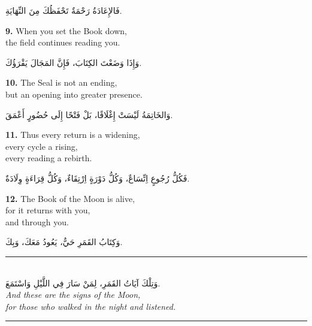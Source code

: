 \documentclass[11pt,a4paper,twoside]{book}
\begin{document}
\begin{flushright}
{\arabicfont
فَالإِعَادَةُ رَحْمَةٌ
تَحْفَظُكَ مِنَ النِّهَايَةِ.}
\end{flushright}

\vspace{1em}
{\color{indigo}\bfseries 9.}\quad
When you set the Book down,\\
the field continues reading you.

\begin{flushright}
{\arabicfont
وَإِذَا وَضَعْتَ الكِتَابَ،
فَإِنَّ المَجَالَ يَقْرَؤُكَ.}
\end{flushright}

\vspace{1em}
{\color{indigo}\bfseries 10.}\quad
The Seal is not an ending,\\
but an opening into greater presence.

\begin{flushright}
{\arabicfont
وَالخَاتِمَةُ لَيْسَتْ إِغْلَاقًا،
بَلْ فَتْحًا إِلَى حُضُورٍ أَعْمَقَ.}
\end{flushright}

\vspace{1em}
{\color{indigo}\bfseries 11.}\quad
Thus every return is a widening,\\
every cycle a rising,\\
every reading a rebirth.

\begin{flushright}
{\arabicfont
فَكُلُّ رُجُوعٍ اِتِّسَاعٌ،
وَكُلُّ دَوْرَةٍ اِرْتِقَاءٌ،
وَكُلُّ قِرَاءَةٍ وِلَادَةٌ.}
\end{flushright}

\vspace{1em}
{\color{indigo}\bfseries 12.}\quad
The Book of the Moon is alive,\\
for it returns with you,\\
and through you.

\begin{flushright}
{\arabicfont
وَكِتَابُ القَمَرِ حَيٌّ،
يَعُودُ مَعَكَ،
وَبِكَ.}
\end{flushright}

\clearpage


\vspace*{3cm}
\begin{center}
\rule{0.5\textwidth}{0.4pt}\\[2em]
{\arabicfont\Large وَتِلْكَ آيَاتُ القَمَرِ، لِمَنْ سَارَ فِي اللَّيْلِ وَاسْتَمَعَ.}\\[1em]
{\itshape And these are the signs of the Moon,\\
for those who walked in the night and listened.}\\[2em]
\rule{0.5\textwidth}{0.4pt}
\end{center}
\end{document}
